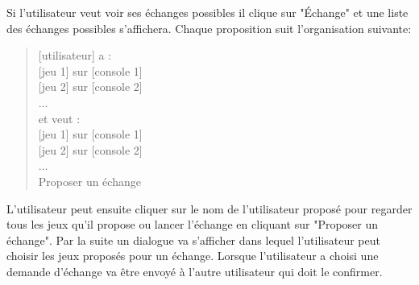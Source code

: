 \documentclass[a4paper,12pt,abstracton,titlepage]{scrartcl}
\begin{document}
Si l'utilisateur veut voir ses échanges possibles il clique sur "Échange" et une liste des échanges possibles s'affichera. Chaque proposition suit l'organisation suivante:\\

\begin{quote}
{[utilisateur]} a :\\
{[jeu 1]} sur {[console 1]}\\
{[jeu 2]} sur {[console 2]}\\
...\\
et veut :\\
{[jeu 1]} sur {[console 1]}\\
{[jeu 2]} sur {[console 2]}\\
...\\
Proposer un échange\\
\end{quote}

L'utilisateur peut ensuite cliquer sur le nom de l'utilisateur proposé pour regarder tous les jeux qu'il propose ou lancer l'échange en cliquant sur "Proposer un échange". Par la suite un dialogue va s'afficher dans lequel l'utilisateur peut choisir les jeux proposés pour un échange. Lorsque l'utilisateur a choisi une demande d'échange va être envoyé à l'autre utilisateur qui doit le confirmer.

\newpage
\end{document}
